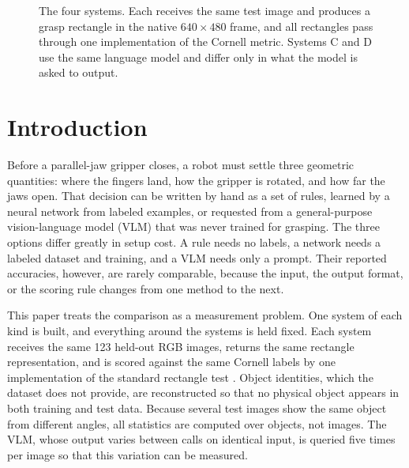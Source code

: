 \documentclass[10pt,conference,compsoc]{IEEEtran}
\begin{document}
\begin{figure}[t]
\caption{The four systems. Each receives the same test image and produces a
grasp rectangle in the native $640\times480$ frame, and all rectangles pass
through one implementation of the Cornell metric. Systems C and D use the same
language model and differ only in what the model is asked to output.}
\label{fig:pipelines}
\end{figure}

\section{Introduction}

Before a parallel-jaw gripper closes, a robot must settle three geometric
quantities: where the fingers land, how the gripper is rotated, and how far
the jaws open. That decision can be written by hand as a set of rules, learned
by a neural network from labeled examples, or requested from a
general-purpose vision-language model (VLM) that was never trained for
grasping. The three options differ greatly in setup cost. A rule needs no
labels, a network needs a labeled dataset and training, and a VLM needs only
a prompt. Their reported accuracies, however, are rarely comparable, because
the input, the output format, or the scoring rule changes from one method to
the next.

This paper treats the comparison as a measurement problem. One system of each
kind is built, and everything around the systems is held fixed. Each system
receives the same 123 held-out RGB images, returns the same rectangle
representation, and is scored against the same Cornell labels by one
implementation of the standard rectangle test \cite{jiang2011,lenz2015}.
Object identities, which the dataset does not provide, are reconstructed so
that no physical object appears in both training and test data. Because
several test images show the same object from different angles, all
statistics are computed over objects, not images. The VLM, whose output
varies between calls on identical input, is queried five times per image so
that this variation can be measured.
\end{document}
